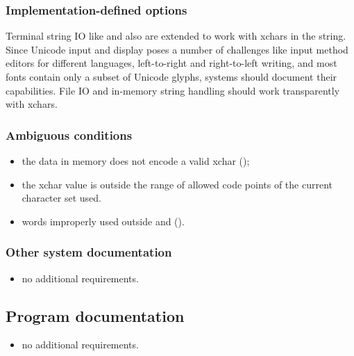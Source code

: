 \subsubsection{Implementation-defined options} %

Terminal string IO like  and  also are extended to
work with xchars in the string.  Since Unicode input and display poses a
number of challenges like input method editors for different languages,
left-to-right and right-to-left writing, and most fonts contain only a subset
of Unicode glyphs, systems should document their capabilities.  File IO and
in-memory string handling should work transparently with xchars.


\subsubsection{Ambiguous conditions} %

\begin{itemize}
\item the data in memory does not encode a valid xchar
	();
\item the xchar value is outside the range of allowed code points of
	the current character set used.
\item words improperly used outside
	 and 
	().
\end{itemize}

\subsubsection{Other system documentation} %
\begin{itemize}
\item no additional requirements.
\end{itemize}

\subsection{Program documentation} %
\begin{itemize}
\item no additional requirements.
\end{itemize}

